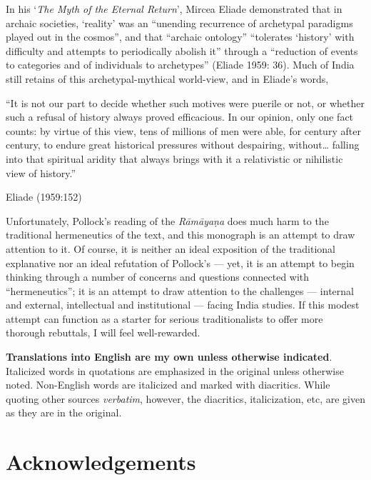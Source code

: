 In his ‘{\sl The Myth of the Eternal Return}’, Mircea Eliade demonstrated that in archaic societies, ‘reality’ was an “unending recurrence of archetypal paradigms played out in the cosmos”, and that “archaic ontology” “tolerates ‘history’ with difficulty and attempts to periodically abolish it” through a “reduction of events to categories and of individuals to archetypes” (Eliade 1959: 36). Much of India still retains of this archetypal-mythical world-view, and in Eliade’s words,  

\begin{myquote}
“It is not our part to decide whether such motives were puerile or not, or whether such a refusal of history always proved efficacious. In our opinion, only one fact counts: by virtue of this view, tens of millions of men were able, for century after century, to endure great historical pressures without despairing, without… falling into that spiritual aridity that always brings with it a relativistic or nihilistic view of history.”

\hfill Eliade (1959:152)
\end{myquote}

Unfortunately, Pollock’s reading of the {\sl Rāmāyaṇa} does much harm to the traditional hermeneutics of the text, and this monograph is an attempt to draw attention to it. Of course, it is neither an ideal exposition of the traditional explanative nor an ideal refutation of Pollock’s --- yet, it is an attempt to begin thinking through a number of concerns and questions connected with “hermeneutics”; it is an attempt to draw attention to the challenges --- internal and external, intellectual and institutional --- facing India studies. If this modest attempt can function as a starter for serious traditionalists to offer more thorough rebuttals, I will feel well-rewarded. 


{\bf Translations into English are my own unless otherwise indicated}. Italicized words in quotations are emphasized in the original unless otherwise noted. Non-English words are italicized and marked with diacritics. While quoting other sources {\sl verbatim}, however, the diacritics, italicization, etc, are given as they are in the original. 



\chapter*{Acknowledgements}\label{ack}


